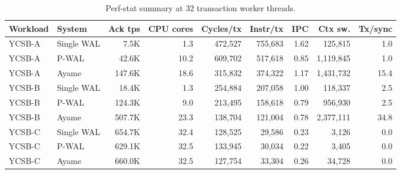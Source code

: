 \begin{table}[t]
  \centering
  \caption{Perf-stat summary at 32 transaction worker threads.}
  \label{tab:perf-stat-32worker}
  \small
  \setlength{\tabcolsep}{6pt}
  \begin{tabular}{llrrrrrrr}
    \hline
    Workload & System & Ack tps & CPU cores & Cycles/tx & Instr/tx & IPC & Ctx sw. & Tx/sync \\
    \hline
    YCSB-A & Single WAL & 7.5K & 1.3 & 472,527 & 755,683 & 1.62 & 125,815 & 1.0 \\
    YCSB-A & P-WAL & 42.6K & 10.2 & 609,702 & 517,618 & 0.85 & 1,119,845 & 1.0 \\
    YCSB-A & Ayame & 147.6K & 18.6 & 315,832 & 374,322 & 1.17 & 1,431,732 & 15.4 \\
    YCSB-B & Single WAL & 18.4K & 1.3 & 254,884 & 207,058 & 1.00 & 118,337 & 2.5 \\
    YCSB-B & P-WAL & 124.3K & 9.0 & 213,495 & 158,618 & 0.79 & 956,930 & 2.5 \\
    YCSB-B & Ayame & 507.7K & 23.3 & 138,704 & 121,004 & 0.78 & 2,377,111 & 34.8 \\
    YCSB-C & Single WAL & 654.7K & 32.4 & 128,525 & 29,586 & 0.23 & 3,126 & 0.0 \\
    YCSB-C & P-WAL & 629.1K & 32.5 & 133,945 & 30,034 & 0.22 & 3,405 & 0.0 \\
    YCSB-C & Ayame & 660.0K & 32.5 & 127,754 & 33,304 & 0.26 & 34,728 & 0.0 \\
    \hline
  \end{tabular}
\end{table}
